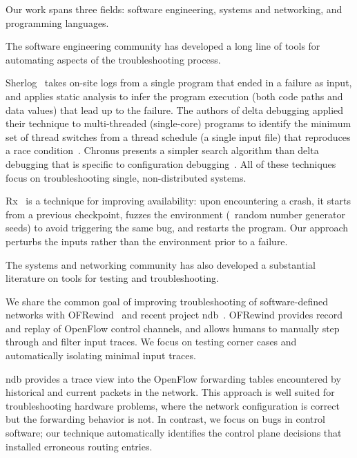 Our work spans three fields: software engineering, systems and networking, and
programming languages.

The software engineering community has developed a long line of tools for automating
aspects of the troubleshooting process.

Sherlog~\cite{Yuan:2010:SED:1736020.1736038} takes on-site logs from a
single program that ended in a failure as input, and applies static analysis to infer the
program execution (both code paths and data values) that lead up to the failure.
The authors of delta debugging
applied their technique to multi-threaded (single-core) programs
to identify the minimum set of thread
switches from a thread schedule (a single input file) that reproduces
a race condition~\cite{choi2002isolating}. Chronus presents a simpler search
algorithm than delta debugging that is specific to configuration
debugging~\cite{whitaker2004configuration}.
All of these techniques focus on troubleshooting single, non-distributed
systems.

Rx~\cite{qin2005rx} is a technique for improving availability: upon
encountering a crash, it starts from a previous checkpoint, fuzzes
the environment (\eg~random number generator seeds) to avoid triggering the same bug,
and restarts the program. Our
approach perturbs the inputs rather than the environment
prior to a failure.

The systems and networking community has also developed a substantial
literature on tools for testing and troubleshooting.

We share the common goal of improving troubleshooting
of software-defined networks with OFRewind~\cite{ofrewind} and
recent project ndb~\cite{handigol2012debugger}. OFRewind provides
record and replay of OpenFlow control channels, and
allows humans to manually step through and filter input traces.
We focus on testing corner cases and automatically
isolating minimal input traces.

ndb provides a
trace view into the OpenFlow forwarding tables
encountered by historical and current packets in the network.
This approach is well suited for troubleshooting hardware problems, where the
network configuration is correct but the forwarding behavior is not.
In contrast, we focus on bugs in control software; our technique
automatically identifies the control plane decisions that installed
erroneous routing entries.

